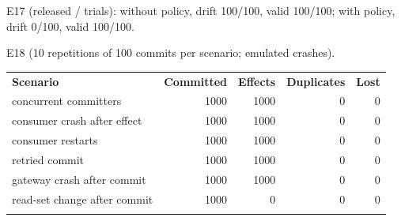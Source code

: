 E17 (released / trials): without policy, drift 100/100, valid 100/100; with policy, drift 0/100, valid 100/100.

E18 (10 repetitions of 100 commits per scenario; emulated crashes).
\begin{center}\small\begin{tabular}{@{}lrrrr@{}}\toprule
\textbf{Scenario} & \textbf{Committed} & \textbf{Effects} & \textbf{Duplicates} & \textbf{Lost} \\ \genrule
\midrule
8 concurrent committers & 1000 & 1000 & 0 & 0 \\ \genrule
consumer crash after effect & 1000 & 1000 & 0 & 0 \\ \genrule
consumer restarts & 1000 & 1000 & 0 & 0 \\ \genrule
retried commit & 1000 & 1000 & 0 & 0 \\ \genrule
gateway crash after commit & 1000 & 1000 & 0 & 0 \\ \genrule
read-set change after commit & 1000 & 0 & 0 & 0 \\ \genrule
\bottomrule\end{tabular}\end{center}
